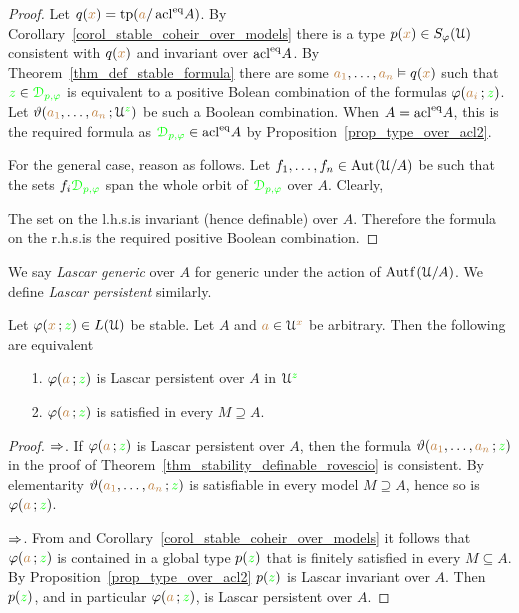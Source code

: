 \begin{proof}
  Let $q({\color{brown} x})={\rm tp}({\color{brown} a}/\mathop{\rm acl}^{{\rm eq}}\!A)$.
  By Corollary~\ref{corol_stable_coheir_over_models} there is a type $p({\color{brown} x})\in S_\varphi(\EuScript U)$ consistent with $q({\color{brown} x})$ and invariant over $\mathop{\rm acl}^{{\rm eq}}\!A$.
  By Theorem~\ref{thm_def_stable_formula} there are some ${\color{brown} a_1},\dots,{\color{brown} a_n}\vDash q({\color{brown} x})$ such that ${\color{green} z}\in{\color{green}\EuScript D_{p,\varphi}}$ is equivalent to a positive Bolean combination of the formulas $\varphi({\color{brown} a_i}\,;{\color{green} z})$.
  Let $\vartheta({\color{brown} a_1},\dots,{\color{brown} a_n}\,;\EuScript U^{\color{green} z})$ be such a Boolean combination.
  When $A=\mathop{\rm acl}^{{\rm eq}}\!A$, this is the required formula as ${\color{green}\EuScript D_{p,\varphi}}\in\mathop{\rm acl}^{{\rm eq}}\!A$ by Proposition~\ref{prop_type_over_acl2}.

  For the general case, reason as follows.
  Let $f_1,\dots,f_n\in{\rm Aut\kern.15ex}(\EuScript U/A)$ be such that the sets $f_i{\color{green}\EuScript D_{p,\varphi}}$ span the whole orbit of ${\color{green}\EuScript D_{p,\varphi}}$ over $A$.
  Clearly,


  The set on the l.h.s.\@ is invariant (hence definable) over $A$.
  Therefore the formula on the r.h.s.\@ is the required positive Boolean combination.
\end{proof}

We say \emph{Lascar generic\/} over $A$ for generic under the action of $\mathord{\rm Aut\kern.15ex{f}\kern.15ex}(\EuScript U/A)$.
We define \emph{Lascar persistent\/} similarly.

\begin{corollary}\label{corol_persistent_finsat}
  Let $\varphi({\color{brown} x}\,;{\color{green} z})\in L(\EuScript U)$ be stable.
  Let $A$ and ${\color{brown} a}\in\EuScript U^{\color{brown} x}$ be arbitrary.
  Then the following are equivalent
  \begin{itemize}
    \item[1.] $\varphi({\color{brown} a}\,;{\color{green} z})$ is Lascar persistent over $A$ in $\EuScript U^{\color{green} z}$
    \item[2.] $\varphi({\color{brown} a}\,;{\color{green} z})$ is satisfied in every $M\supseteq A$.
  \end{itemize}
\end{corollary}
\begin{proof}
  $\Rightarrow$.
  If $\varphi({\color{brown} a}\,;{\color{green} z})$ is Lascar persistent over $A$, then the formula $\vartheta({\color{brown} a_1},\dots,{\color{brown} a_n}\,;{\color{green} z})$ in the proof of Theorem~\ref{thm_stability_definable_rovescio} is consistent.
  By elementarity $\vartheta({\color{brown} a_1},\dots,{\color{brown} a_n}\,;{\color{green} z})$ is satisfiable in every model $M\supseteq A$, hence so is $\varphi({\color{brown} a}\,;{\color{green} z})$.
  
  $\Rightarrow$.
  From  and Corollary~\ref{corol_stable_coheir_over_models} it follows that $\varphi({\color{brown} a}\,;{\color{green} z})$ is contained in a global type $p({\color{green} z})$ that is finitely satisfied in every $M\subseteq A$.
  By Proposition~\ref{prop_type_over_acl2} $p({\color{green} z})$ is Lascar invariant over $A$.
  Then $p({\color{green} z})$, and in particular $\varphi({\color{brown} a}\,;{\color{green} z})$, is Lascar persistent over $A$.
\end{proof}

